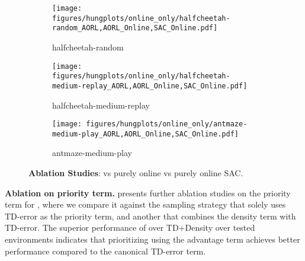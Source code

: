 \begin{figure*}[h]
    \centering
    \begin{subfigure}{.33\textwidth}
        \centering
        \texttt{[image: figures/hungplots/online\_only/halfcheetah-random\_AORL,AORL\_Online,SAC\_Online.pdf]}
        \caption{halfcheetah-random}\label{fig:supp:online_only:1}
    \end{subfigure}\hfil
    \begin{subfigure}{.33\textwidth}
        \centering
        \texttt{[image: figures/hungplots/online\_only/halfcheetah-medium-replay\_AORL,AORL\_Online,SAC\_Online.pdf]}
        \caption{halfcheetah-medium-replay}\label{fig:supp:online_only:2}
    \end{subfigure}\hfil
    \begin{subfigure}{.33\textwidth}
        \centering
        \texttt{[image: figures/hungplots/online\_only/antmaze-medium-play\_AORL,AORL\_Online,SAC\_Online.pdf]}
        \caption{antmaze-medium-play}\label{fig:supp:online_only:3}
    \end{subfigure}\hfil
    \caption{\textbf{Ablation Studies}: \algname vs purely online \algname vs purely online SAC.}
  \label{fig:supp:online_only}
\end{figure*}

\textbf{Ablation on priority term.}  presents further ablation studies on the priority term for \algname, where we compare it against the sampling strategy that solely uses TD-error as the priority term, and another that combines the density term with TD-error. The superior performance of \algname over TD+Density over tested environments indicates that prioritizing using the advantage term achieves better performance compared to the canonical TD-error term.

